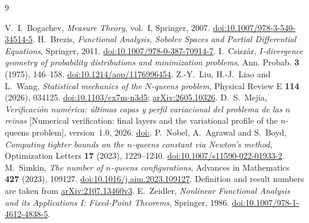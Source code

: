 \begin{thebibliography}{9}
\raggedright
{} V.~I.~Bogachev, \emph{Measure Theory}, vol.~I, Springer, 2007.
\href{https://doi.org/10.1007/978-3-540-34514-5}{doi:10.1007/978-3-540-34514-5}.
 H.~Brezis, \emph{Functional Analysis, Sobolev Spaces and Partial Differential
Equations}, Springer, 2011.
\href{https://doi.org/10.1007/978-0-387-70914-7}{doi:10.1007/978-0-387-70914-7}.
 I.~Csiszár, \emph{$I$-divergence geometry of probability distributions and
minimization problems}, Ann. Probab. \textbf{3} (1975), 146--158.
\href{https://doi.org/10.1214/aop/1176996454}{doi:10.1214/aop/1176996454}.
 Z.-Y.~Liu, H.-J.~Liao and L.~Wang, \emph{Statistical mechanics of the $N$-queens
problem}, Physical Review E \textbf{114} (2026), 034125.
\href{https://doi.org/10.1103/cx7m-n3d5}{doi:10.1103/cx7m-n3d5};
\href{https://arxiv.org/abs/2605.10326}{arXiv:2605.10326}.
\ifx\DOIcodigo\empty\else
{} D.~S.~Mejia, \emph{Verificación numérica: últimas capas y perfil variacional del problema de las $n$ reinas} [Numerical verification: final layers and the variational profile of the $n$-queens problem], version~1.0, 2026.
\href{https://doi.org/\DOIcodigo}{doi:\DOIcodigo}.
\fi
{} P.~Nobel, A.~Agrawal and S.~Boyd, \emph{Computing tighter bounds on the $n$-queens
constant via Newton's method}, Optimization Letters \textbf{17} (2023), 1229--1240.
\href{https://doi.org/10.1007/s11590-022-01933-2}{doi:10.1007/s11590-022-01933-2}.
 M.~Simkin, \emph{The number of $n$-queens configurations}, Advances in Mathematics
\textbf{427} (2023), 109127.
\href{https://doi.org/10.1016/j.aim.2023.109127}{doi:10.1016/j.aim.2023.109127}. Definition and result numbers are taken from \href{https://arxiv.org/abs/2107.13460v3}{arXiv:2107.13460v3}.
 E.~Zeidler, \emph{Nonlinear Functional Analysis and its Applications I:
Fixed-Point Theorems}, Springer, 1986.
\href{https://doi.org/10.1007/978-1-4612-4838-5}{doi:10.1007/978-1-4612-4838-5}.
\end{thebibliography}